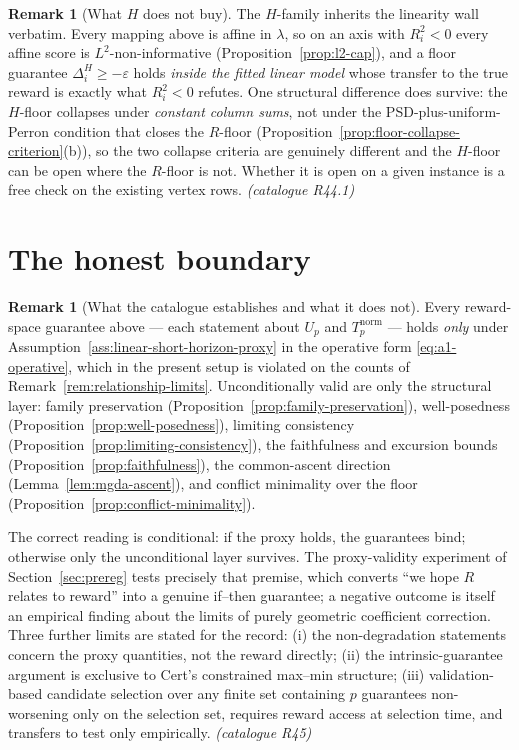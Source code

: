 \documentclass[12pt,a4paper]{report}
\newcommand{\1}{\mathbf{1}}
\theoremstyle{definition}
\newtheorem{remark}[definition]{Remark}
\begin{document}
\begin{remark}[What \(H\) does not buy]
\label{rem:h-limits}
The \(H\)-family inherits the linearity wall verbatim. Every mapping above is affine in \(\lambda\), so on an axis with \(R^2_i<0\) every affine score is \(L^2\)-non-informative (Proposition~\ref{prop:l2-cap}), and a floor guarantee \(\Delta^H_i\ge-\varepsilon\) holds \emph{inside the fitted linear model} whose transfer to the true reward is exactly what \(R^2_i<0\) refutes. One structural difference does survive: the \(H\)-floor collapses under \emph{constant column sums}, not under the PSD-plus-uniform-Perron condition that closes the \(R\)-floor (Proposition~\ref{prop:floor-collapse-criterion}(b)), so the two collapse criteria are genuinely different and the \(H\)-floor can be open where the \(R\)-floor is not. Whether it is open on a given instance is a free check on the existing vertex rows. \emph{(catalogue R44.1)}
\end{remark}

\section{The honest boundary}
\label{sec:honest-boundary}

\begin{remark}[What the catalogue establishes and what it does not]
\label{rem:honest-boundary}
Every reward-space guarantee above --- each statement about \(U_p\) and \(T_p^{\mathrm{norm}}\) --- holds \emph{only} under Assumption~\ref{ass:linear-short-horizon-proxy} in the operative form \eqref{eq:a1-operative}, which in the present setup is violated on the counts of Remark~\ref{rem:relationship-limits}. Unconditionally valid are only the structural layer: family preservation (Proposition~\ref{prop:family-preservation}), well-posedness (Proposition~\ref{prop:well-posedness}), limiting consistency (Proposition~\ref{prop:limiting-consistency}), the faithfulness and excursion bounds (Proposition~\ref{prop:faithfulness}), the common-ascent direction (Lemma~\ref{lem:mgda-ascent}), and conflict minimality over the floor (Proposition~\ref{prop:conflict-minimality}).

The correct reading is conditional: if the proxy holds, the guarantees bind; otherwise only the unconditional layer survives. The proxy-validity experiment of Section~\ref{sec:prereg} tests precisely that premise, which converts ``we hope \(R\) relates to reward'' into a genuine if--then guarantee; a negative outcome is itself an empirical finding about the limits of purely geometric coefficient correction. Three further limits are stated for the record: (i) the non-degradation statements concern the proxy quantities, not the reward directly; (ii) the intrinsic-guarantee argument is exclusive to Cert's constrained max--min structure; (iii) validation-based candidate selection over any finite set containing \(p\) guarantees non-worsening only on the selection set, requires reward access at selection time, and transfers to test only empirically. \emph{(catalogue R45)}
\end{remark}
\end{document}
